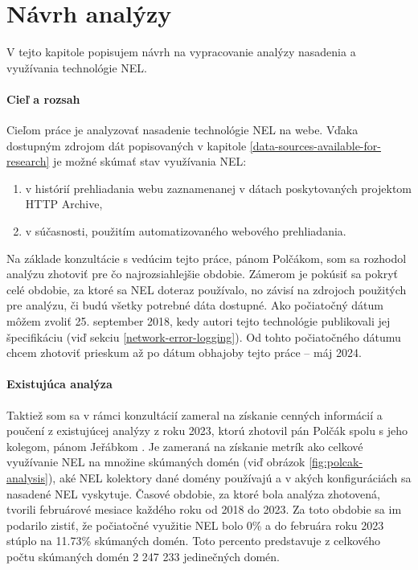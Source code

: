 \chapter{Návrh analýzy}
\label{possible-analysis-strategies}

V tejto kapitole popisujem návrh na vypracovanie analýzy nasadenia a využívania technológie NEL.

\subsubsection{Cieľ a rozsah}

Cieľom práce je analyzovať nasadenie technológie NEL na webe. 
Vďaka dostupným zdrojom dát popisovaných v kapitole \ref{data-sources-available-for-research} je možné skúmať stav využívania NEL:
\begin{enumerate}
    \item v histórií prehliadania webu zaznamenanej v dátach poskytovaných projektom HTTP Archive,
    \item v súčasnosti, použitím automatizovaného webového prehliadania.
\end{enumerate}

Na základe konzultácie s vedúcim tejto práce, pánom Polčákom, som sa rozhodol analýzu zhotoviť pre čo 
najrozsiahlejšie obdobie.
Zámerom je pokúsiť sa pokryť celé obdobie, za ktoré sa NEL doteraz používalo, no závisí na zdrojoch použitých pre analýzu, či budú všetky potrebné dáta dostupné.
Ako počiatočný dátum môžem zvoliť 25. september 2018, kedy autori tejto technológie publikovali jej špecifikáciu (viď sekciu \ref{network-error-logging}).
Od tohto počiatočného dátumu chcem zhotoviť prieskum až po dátum obhajoby tejto práce -- máj 2024.

\subsubsection{Existujúca analýza}

Taktiež som sa v rámci konzultácií zameral na získanie cenných informácií a poučení z existujúcej analýzy z roku 2023,
ktorú zhotovil pán Polčák spolu s jeho kolegom, pánom Jeřábkom \cite{nel-http-archive}.
Je zameraná na získanie metrík ako celkové využívanie NEL na množine skúmaných domén (viď obrázok \ref{fig:polcak-analysis}), aké NEL kolektory dané domény používajú a v akých konfiguráciách sa nasadené NEL vyskytuje.
Časové obdobie, za ktoré bola analýza zhotovená, tvorili februárové mesiace každého roku od 2018 do 2023. 
Za toto obdobie sa im podarilo zistiť, že počiatočné využitie NEL bolo 0\% a do februára roku 2023 stúplo na 11.73\% skúmaných domén.
Toto percento predstavuje z celkového počtu skúmaných domén 2 247 233 jedinečných domén.

